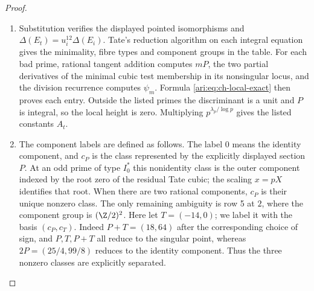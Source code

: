 \begin{proof}
\begin{enumerate}[label=\arabic*.,leftmargin=*]
\item Substitution verifies the displayed pointed isomorphisms and
$\Delta(E_t)=u_i^{12}\Delta(E_i)$.
Tate's reduction algorithm on each integral equation gives the
minimality, fibre types and component groups in the table.
For each bad prime, rational tangent addition computes $mP$,
the two partial derivatives of the minimal cubic test membership
in its nonsingular locus, and the division recurrence computes $\psi_m$.
Formula
\eqref{ari:eq:ch-local-exact} then proves each entry. Outside the
listed primes the discriminant is a unit and $P$ is integral,
so the local height is zero. Multiplying $p^{\lambda_p/\log p}$
gives the listed constants $A_t$.

\item The component labels are defined as follows. The label $0$
means the identity component, and $c_P$ is the class represented
by the explicitly displayed section $P$. At an odd prime of
type $I_0^*$ this nonidentity class is the outer component
indexed by the root zero of the residual Tate cubic; the
scaling $x=pX$ identifies that root. When there are two
rational components, $c_P$ is their unique nonzero class.
The only remaining ambiguity is row 5 at $2$, where the
component group is $(\Z/2)^2$. Here let $T=(-14,0)$;
we label it with the basis $(c_P,c_T)$. Indeed
$P+T=(18,64)$ after the corresponding choice of sign,
and $P,T,P+T$ all reduce to the singular point, whereas
$2P=(25/4,99/8)$ reduces to the identity component.
Thus the three nonzero classes are explicitly separated.


\end{enumerate}
\end{proof}
